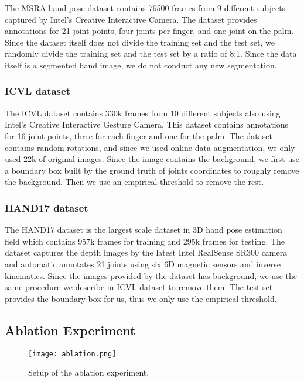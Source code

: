 \documentclass[journal]{IEEEtran}
\begin{document}
The MSRA hand pose dataset\cite{sun2015cascaded} contains 76500 frames from 9 different subjects captured by Intel’s Creative Interactive Camera. 
The dataset provides annotations for 21 joint points, four joints per finger, and one joint on the palm. 
Since the dataset itself does not divide the training set and the test set, 
we randomly divide the training set and the test set by a ratio of 8:1. 
Since the data itself is a segmented hand image, we do not conduct any new segmentation.

\subsubsection{ICVL dataset}

The ICVL dataset\cite{tang2014latent} contains 330k frames from 10 different subjects also using Intel’s Creative Interactive Gesture Camera. 
This dataset contains annotations for 16 joint points, three for each finger and one for the palm. 
The dataset contains random rotations, and since we used online data augmentation, we only used 22k of original images. 
Since the image contains the background, we first use a boundary box built by the ground truth of joints coordinates to 
roughly remove the background. Then we use an empirical threshold to remove the rest.

\subsubsection{HAND17 dataset}

The HAND17 dataset\cite{yuan2018depth} is the largest scale dataset in 3D hand pose estimation field 
which contains 957k frames for training and 295k frames for testing. 
The dataset captures the depth images by the latest Intel RealSense SR300 camera and 
automatic annotates 21 joints using six 6D magnetic sensors and inverse kinematics. 
Since the images provided by the dataset has background, we use the same procedure we describe in ICVL dataset to remove them. 
The test set provides the boundary box for us, thus we only use the empirical threshold.

\subsection{Ablation Experiment}

\begin{figure}[!t]
  \centering
  \texttt{[image: ablation.png]}
  \caption{Setup of the ablation experiment.}
  \label{Ablation_setup}
\end{figure}
\end{document}
